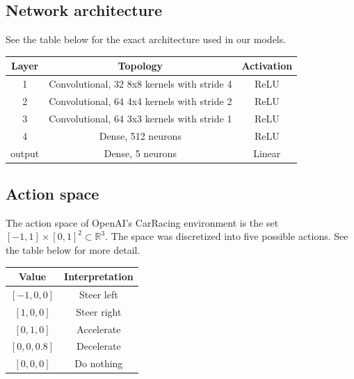 \documentclass{article}
\begin{document}
\subsection{Network architecture}
See the table below for the exact architecture used in our models. 
\begin{table}[h!]
  \begin{center}
    \begin{tabular}{c|c|c}
      \textbf{Layer} & \textbf{Topology} & \textbf{Activation}\\
      \hline
      1 & Convolutional, 32 8x8 kernels with stride 4 & ReLU \\
      2 & Convolutional, 64 4x4 kernels with stride 2 & ReLU \\      
      3 & Convolutional, 64 3x3 kernels with stride 1 & ReLU \\
      4 & Dense, 512 neurons & ReLU \\
      output & Dense, 5 neurons & Linear \\
    \end{tabular}
    \vspace{0.1cm}
    \label{tab:network_architecture}
  \end{center}
\end{table}

\subsection{Action space}
The action space of OpenAI's CarRacing environment is the set $[-1,1]
\times [0,1]^2 \subset \mathbb{R}^3$. The space was discretized into
five possible actions. See the table below for more detail.  
\begin{table}[h!]
  \begin{center}
    \begin{tabular}{c|c}
      \textbf{Value} & \textbf{Interpretation} \\
      \hline
      $[-1,0,0]$ & Steer left \\
      $[1,0,0]$ & Steer right \\
      $[0,1,0]$ & Accelerate \\
      $[0,0,0.8]$ & Decelerate \\
      $[0,0,0]$ & Do nothing \\
    \end{tabular}
    \vspace{0.1cm}
    \label{tab:actions}
  \end{center}
\end{table}
\end{document}
